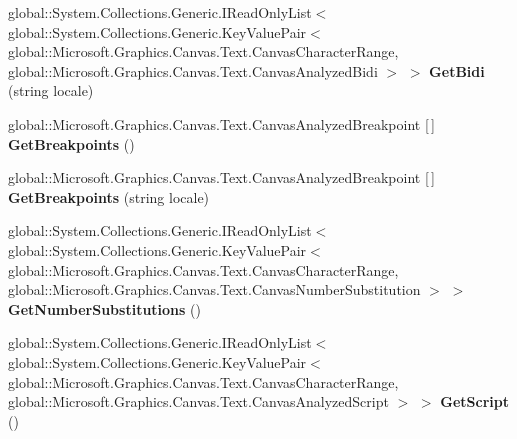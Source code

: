 \begin{DoxyCompactItemize}
\item 
\mbox{\label{class_microsoft_1_1_graphics_1_1_canvas_1_1_text_1_1_canvas_text_analyzer_a2e6d9177ebbc245e8b654995526c08c6}} 
global\+::\+System.\+Collections.\+Generic.\+I\+Read\+Only\+List$<$ global\+::\+System.\+Collections.\+Generic.\+Key\+Value\+Pair$<$ global\+::\+Microsoft.\+Graphics.\+Canvas.\+Text.\+Canvas\+Character\+Range, global\+::\+Microsoft.\+Graphics.\+Canvas.\+Text.\+Canvas\+Analyzed\+Bidi $>$ $>$ {\bfseries Get\+Bidi} (string locale)
\item 
\mbox{\label{class_microsoft_1_1_graphics_1_1_canvas_1_1_text_1_1_canvas_text_analyzer_a8c6c6adb235f7f370a7d2cd4be812e59}} 
global\+::\+Microsoft.\+Graphics.\+Canvas.\+Text.\+Canvas\+Analyzed\+Breakpoint \mbox{[}$\,$\mbox{]} {\bfseries Get\+Breakpoints} ()
\item 
\mbox{\label{class_microsoft_1_1_graphics_1_1_canvas_1_1_text_1_1_canvas_text_analyzer_a7f12634faf61280080d6775ca31df5f7}} 
global\+::\+Microsoft.\+Graphics.\+Canvas.\+Text.\+Canvas\+Analyzed\+Breakpoint \mbox{[}$\,$\mbox{]} {\bfseries Get\+Breakpoints} (string locale)
\item 
\mbox{\label{class_microsoft_1_1_graphics_1_1_canvas_1_1_text_1_1_canvas_text_analyzer_ab7c0ac36c53cf72f84cbb4afc2027819}} 
global\+::\+System.\+Collections.\+Generic.\+I\+Read\+Only\+List$<$ global\+::\+System.\+Collections.\+Generic.\+Key\+Value\+Pair$<$ global\+::\+Microsoft.\+Graphics.\+Canvas.\+Text.\+Canvas\+Character\+Range, global\+::\+Microsoft.\+Graphics.\+Canvas.\+Text.\+Canvas\+Number\+Substitution $>$ $>$ {\bfseries Get\+Number\+Substitutions} ()
\item 
\mbox{\label{class_microsoft_1_1_graphics_1_1_canvas_1_1_text_1_1_canvas_text_analyzer_a5433100913a09da60dd47164a91bfe82}} 
global\+::\+System.\+Collections.\+Generic.\+I\+Read\+Only\+List$<$ global\+::\+System.\+Collections.\+Generic.\+Key\+Value\+Pair$<$ global\+::\+Microsoft.\+Graphics.\+Canvas.\+Text.\+Canvas\+Character\+Range, global\+::\+Microsoft.\+Graphics.\+Canvas.\+Text.\+Canvas\+Analyzed\+Script $>$ $>$ {\bfseries Get\+Script} ()

\end{DoxyCompactItemize}
